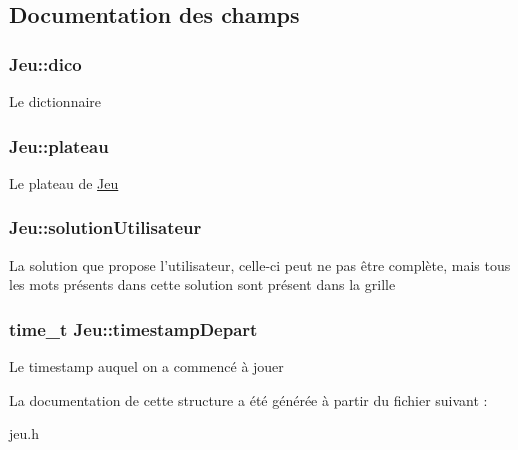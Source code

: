 \subsection{Documentation des champs}
\hypertarget{structJeu_a6bda384c6fca4e83ae15ac69f2228a41}{
\subsubsection[{dico}]{ Jeu\-::dico}}\label{structJeu_a6bda384c6fca4e83ae15ac69f2228a41}
Le dictionnaire \hypertarget{structJeu_af2931c71f6de940ec7ed3fcd2f9d7158}{
\subsubsection[{plateau}]{ Jeu\-::plateau}}\label{structJeu_af2931c71f6de940ec7ed3fcd2f9d7158}
Le plateau de \hyperlink{structJeu}{Jeu} \hypertarget{structJeu_ae8e1dca71285915404d1de4ff609a1d6}{
\subsubsection[{solution\-Utilisateur}]{ Jeu\-::solution\-Utilisateur}}\label{structJeu_ae8e1dca71285915404d1de4ff609a1d6}
La solution que propose l'utilisateur, celle-\/ci peut ne pas être complète, mais tous les mots présents dans cette solution sont présent dans la grille \hypertarget{structJeu_af48a5fddf1dc40b7c4a85918d73f201d}{
\subsubsection[{timestamp\-Depart}]{\setlength{\rightskip}{0pt plus 5cm}time\-\_\-t Jeu\-::timestamp\-Depart}}\label{structJeu_af48a5fddf1dc40b7c4a85918d73f201d}
Le timestamp auquel on a commencé à jouer 

La documentation de cette structure a été générée à partir du fichier suivant \-:\begin{DoxyCompactItemize}
\item 
jeu.\-h\end{DoxyCompactItemize}
